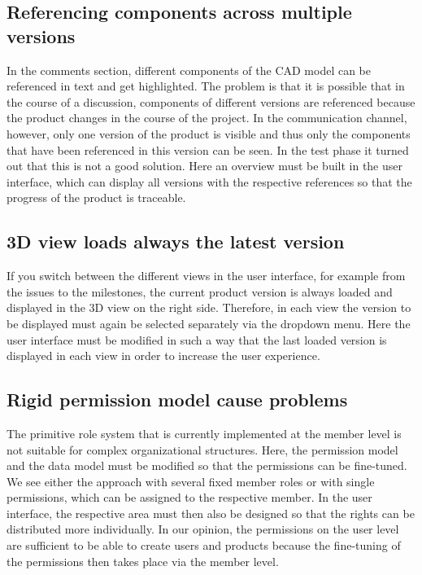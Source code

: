 \subsection*{Referencing components across multiple versions}
In the comments section, different components of the CAD model can be referenced in text and get highlighted. The problem is that it is possible that in the course of a discussion, components of different versions are referenced because the product changes in the course of the project. In the communication channel, however, only one version of the product is visible and thus only the components that have been referenced in this version can be seen. In the test phase it turned out that this is not a good solution. Here an overview must be built in the user interface, which can display all versions with the respective references so that the progress of the product is traceable.

\subsection*{3D view loads always the latest version}
If you switch between the different views in the user interface, for example from the issues to the milestones, the current product version is always loaded and displayed in the 3D view on the right side. Therefore, in each view the version to be displayed must again be selected separately via the dropdown menu. Here the user interface must be modified in such a way that the last loaded version is displayed in each view in order to increase the user experience.

\subsection*{Rigid permission model cause problems}
The primitive role system that is currently implemented at the member level is not suitable for complex organizational structures. Here, the permission model and the data model must be modified so that the permissions can be fine-tuned. We see either the approach with several fixed member roles or with single permissions, which can be assigned to the respective member. In the user interface, the respective area must then also be designed so that the rights can be distributed more individually. In our opinion, the permissions on the user level are sufficient to be able to create users and products because the fine-tuning of the permissions then takes place via the member level.


